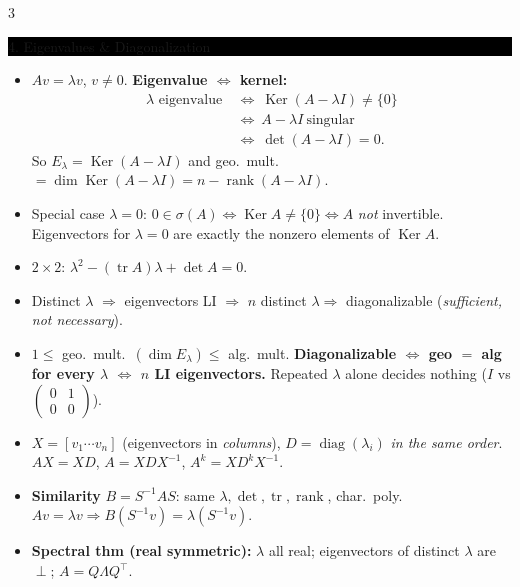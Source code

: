 \documentclass[8pt,letterpaper]{article}
\makeatletter
\newcommand{\sect}[1]{%
  \vspace{2.2pt}%
  \noindent\colorbox{black}{\parbox{\dimexpr\linewidth-2\fboxsep}{%
    \color{white}\bfseries\scshape\fontsize{6.4}{7.4}\selectfont
    \hyphenpenalty=10000\exhyphenpenalty=10000\raggedright #1}}%
  \vspace{1.4pt}\par\nopagebreak\@afterheading}
\newenvironment{tl}
  {\begin{itemize}[leftmargin=6pt,itemsep=0.3pt,topsep=1pt,parsep=0pt,
                   partopsep=0pt,label=\textcolor{gray}{\tiny$\bullet$}]}
  {\end{itemize}}
\newcommand{\tr}{\operatorname{tr}}
\newcommand{\rank}{\operatorname{rank}}
\newcommand{\Ker}{\operatorname{Ker}}
\newcommand{\tp}{^{\!\top}}
\makeatother
\begin{document}
\begin{multicols}{3}
\sect{4. Eigenvalues \& Diagonalization}
\begin{tl}
\item $Av=\lambda v$, $v\neq0$. \textbf{Eigenvalue $\iff$ kernel:}
\begin{align*}
\lambda\text{ eigenvalue}\ &\iff\ \Ker(A-\lambda I)\neq\{0\}\\
&\iff\ A-\lambda I\ \text{singular}\\
&\iff\ \det(A-\lambda I)=0.
\end{align*}
So $E_\lambda=\Ker(A-\lambda I)$ and geo.\ mult.\ $=\dim\Ker(A-\lambda I)=n-\rank(A-\lambda I)$.
\item Special case $\lambda=0$: $0\in\sigma(A)\iff\Ker A\neq\{0\}\iff A$ \emph{not} invertible. Eigenvectors for $\lambda=0$ are exactly the nonzero elements of $\Ker A$.
\item $2\times2$: $\lambda^2-(\tr A)\lambda+\det A=0$.
\item Distinct $\lambda$ $\Rightarrow$ eigenvectors LI $\Rightarrow$ $n$ distinct $\lambda\Rightarrow$ diagonalizable (\emph{sufficient, not necessary}).
\item $1\le$ geo.\ mult.\ $(\dim E_\lambda)\le$ alg.\ mult. \textbf{Diagonalizable $\iff$ geo $=$ alg for every $\lambda$ $\iff$ $n$ LI eigenvectors.} Repeated $\lambda$ alone decides nothing ($I$ vs $\left(\begin{smallmatrix}0&1\\0&0\end{smallmatrix}\right)$).
\item $X=[v_1\cdots v_n]$ (eigenvectors in \emph{columns}), $D=\operatorname{diag}(\lambda_i)$ \emph{in the same order}. $AX=XD$, $A=XDX^{-1}$, \textbf{$A^k=XD^kX^{-1}$}.
\item \textbf{Similarity} $B=S^{-1}AS$: same $\lambda,\det,\tr,\rank$, char.\ poly. $Av=\lambda v\Rightarrow B(S^{-1}v)=\lambda(S^{-1}v)$.
\item \textbf{Spectral thm (real symmetric):} $\lambda$ all real; eigenvectors of distinct $\lambda$ are $\perp$; $A=Q\Lambda Q\tp$.
\end{tl}


\end{multicols}
\end{document}
